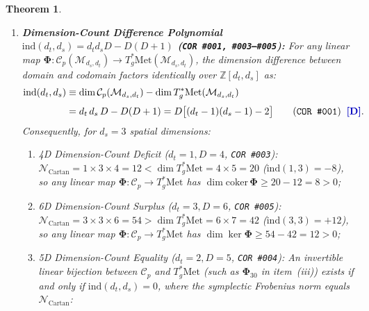 \documentclass[11pt,a4paper]{article}
\newcommand{\catD}{\text{\textbf{\textcolor{blue!75!black}{[D]}}}}
\theoremstyle{definition}
\theoremstyle{plain}
\newtheorem{theorem}[axiom]{Theorem}
\theoremstyle{remark}
\begin{document}
\begin{theorem}
\begin{enumerate}[label=(\roman*)]
  \begin{align}
  \left|\det(\bm{\Phi}_{30})\right| &= 2^{-6} = \frac{1}{64} \neq 0, \qquad
  \left(\bm{\Phi}_{30}^{-1}\mathbf{J}_{30}\bm{\Phi}_{30}\right)^2 = -\mathbb{I}_{30}
  \qquad \textnormal{(\texttt{COR~\#021})} \;\;\catD, \nonumber \\[4pt]
  \bm{\Omega}_{\mathrm{pull}} &\equiv \bm{\Phi}_{30}^T\mathbf{J}_{30}\bm{\Phi}_{30} = -\bm{\Omega}_{\mathrm{pull}}^T \qquad \catD, \nonumber \\[3pt]
  \det(\bm{\Omega}_{\mathrm{pull}}) &= \left(\det\bm{\Phi}_{30}\right)^2 = 2^{-12} > 0
  \qquad \textnormal{(\texttt{COR~\#022})} \;\;\catD. \label{eq:c1_phi30_bijection}
  \end{align}
  \item \textbf{Dimension-Count Difference Polynomial $\mathrm{ind}(d_t, d_s) = d_t d_s D - D(D+1)$ (\texttt{COR~\#001, \#003--\#005}):}
  For any linear map $\bm{\Phi}: \mathcal{C}_p(\mathcal{M}_{d_s,d_t}) \to T^*_g\mathrm{Met}(\mathcal{M}_{d_s,d_t})$, the dimension difference between domain and codomain factors identically over $\mathbb{Z}[d_t, d_s]$ as:
  \begin{align}
  \mathrm{ind}(d_t, d_s) &\equiv \dim\mathcal{C}_p(\mathcal{M}_{d_s,d_t}) - \dim T^*_g\mathrm{Met}(\mathcal{M}_{d_s,d_t}) \nonumber \\[3pt]
  &= d_t\,d_s\,D - D(D + 1) = D\big[(d_t - 1)(d_s - 1) - 2\big] \qquad \textnormal{(\texttt{COR~\#001})} \;\;\catD. \label{eq:c1_rank_nullity_index}
  \end{align}
  Consequently, for $d_s = 3$ spatial dimensions:
  \begin{enumerate}[label=(\alph*)]
    \item \emph{4D Dimension-Count Deficit ($d_t = 1, D = 4$, \texttt{COR~\#003}):} $\mathcal{N}_{\mathrm{Cartan}} = 1 \times 3 \times 4 = 12 < \dim T^*_g\mathrm{Met} = 4 \times 5 = 20$ ($\mathrm{ind}(1,3) = -8$), so any linear map $\bm{\Phi}: \mathcal{C}_p \to T^*_g\mathrm{Met}$ has $\dim\mathrm{coker}\,\bm{\Phi} \ge 20 - 12 = 8 > 0$;
    \item \emph{6D Dimension-Count Surplus ($d_t = 3, D = 6$, \texttt{COR~\#005}):} $\mathcal{N}_{\mathrm{Cartan}} = 3 \times 3 \times 6 = 54 > \dim T^*_g\mathrm{Met} = 6 \times 7 = 42$ ($\mathrm{ind}(3,3) = +12$), so any linear map $\bm{\Phi}: \mathcal{C}_p \to T^*_g\mathrm{Met}$ has $\dim\ker\bm{\Phi} \ge 54 - 42 = 12 > 0$;
    \item \emph{5D Dimension-Count Equality ($d_t = 2, D = 5$, \texttt{COR~\#004}):} An invertible linear bijection between $\mathcal{C}_p$ and $T^*_g\mathrm{Met}$ (such as $\bm{\Phi}_{30}$ in item~(iii)) exists if and only if $\mathrm{ind}(d_t, d_s) = 0$, where the symplectic Frobenius norm equals $\mathcal{N}_{\mathrm{Cartan}}$:

\end{enumerate}
\end{enumerate}
\end{theorem}
\end{document}
